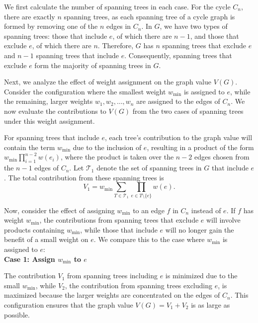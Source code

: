\documentclass[12pt,letterpaper]{article}
\begin{document}
We first calculate the number of spanning trees in each case. For the cycle \( C_n \), there are exactly \( n \) spanning trees, as each spanning tree of a cycle graph is formed by removing one of the \( n \) edges in \( C_n \). In \( G \), we have two types of spanning trees: those that include \( e \), of which there are \( n - 1 \), and those that exclude \( e \), of which there are \( n \). Therefore, \( G \) has \( n \) spanning trees that exclude \( e \) and \( n - 1 \) spanning trees that include \( e \). Consequently, spanning trees that exclude \( e \) form the majority of spanning trees in \( G \).

Next, we analyze the effect of weight assignment on the graph value \( V(G) \). Consider the configuration where the smallest weight \( w_{\min} \) is assigned to \( e \), while the remaining, larger weights \( w_1, w_2, \ldots, w_n \) are assigned to the edges of \( C_n \). We now evaluate the contributions to \( V(G) \) from the two cases of spanning trees under this weight assignment.

For spanning trees that include \( e \), each tree’s contribution to the graph value will contain the term \( w_{\min} \) due to the inclusion of \( e \), resulting in a product of the form \( w_{\min} \prod_{i=1}^{n-2} w(e_i) \), where the product is taken over the \( n - 2 \) edges chosen from the \( n-1 \) edges of \( C_n \). Let \( \mathcal{T}_1 \) denote the set of spanning trees in \( G \) that include \( e \). The total contribution from these spanning trees is
\[
V_1 = w_{\min} \sum_{T \in \mathcal{T}_1} \prod_{e \in T \setminus \{e\}} w(e).
\]

Now, consider the effect of assigning \( w_{\min} \) to an edge \( f \) in \( C_n \) instead of \( e \). If \( f \) has weight \( w_{\min} \), the contributions from spanning trees that exclude \( e \) will involve products containing \( w_{\min} \), while those that include \( e \) will no longer gain the benefit of a small weight on \( e \). We compare this to the case where \( w_{\min} \) is assigned to \( e \):\\

\textbf{Case 1: Assign \( w_{\min} \) to \( e \)}

The contribution \( V_1 \) from spanning trees including \( e \) is minimized due to the small \( w_{\min} \), while \( V_2 \), the contribution from spanning trees excluding \( e \), is maximized because the larger weights are concentrated on the edges of \( C_n \). This configuration ensures that the graph value \( V(G) = V_1 + V_2 \) is as large as possible.\\
\end{document}
